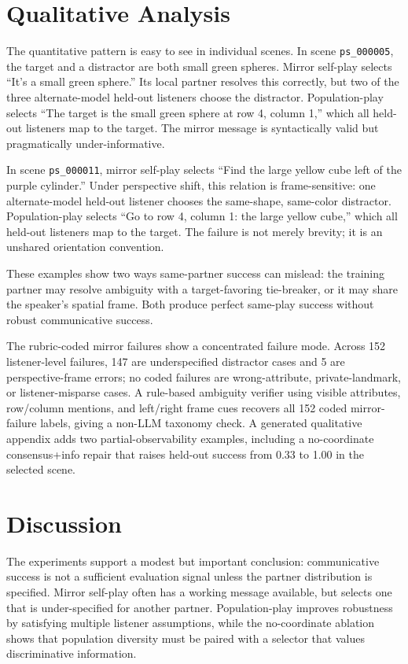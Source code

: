 \documentclass[10pt]{article}
\begin{document}
\section{Qualitative Analysis}

The quantitative pattern is easy to see in individual scenes. In scene \texttt{ps\_000005}, the target and a distractor are both small green spheres. Mirror self-play selects ``It's a small green sphere.'' Its local partner resolves this correctly, but two of the three alternate-model held-out listeners choose the distractor. Population-play selects ``The target is the small green sphere at row 4, column 1,'' which all held-out listeners map to the target. The mirror message is syntactically valid but pragmatically under-informative.

In scene \texttt{ps\_000011}, mirror self-play selects ``Find the large yellow cube left of the purple cylinder.'' Under perspective shift, this relation is frame-sensitive: one alternate-model held-out listener chooses the same-shape, same-color distractor. Population-play selects ``Go to row 4, column 1: the large yellow cube,'' which all held-out listeners map to the target. The failure is not merely brevity; it is an unshared orientation convention.

These examples show two ways same-partner success can mislead: the training partner may resolve ambiguity with a target-favoring tie-breaker, or it may share the speaker's spatial frame. Both produce perfect same-play success without robust communicative success.

The rubric-coded mirror failures show a concentrated failure mode. Across 152 listener-level failures, 147 are underspecified distractor cases and 5 are perspective-frame errors; no coded failures are wrong-attribute, private-landmark, or listener-misparse cases. A rule-based ambiguity verifier using visible attributes, row/column mentions, and left/right frame cues recovers all 152 coded mirror-failure labels, giving a non-LLM taxonomy check. A generated qualitative appendix adds two partial-observability examples, including a no-coordinate consensus+info repair that raises held-out success from 0.33 to 1.00 in the selected scene.

\section{Discussion}

The experiments support a modest but important conclusion: communicative success is not a sufficient evaluation signal unless the partner distribution is specified. Mirror self-play often has a working message available, but selects one that is under-specified for another partner. Population-play improves robustness by satisfying multiple listener assumptions, while the no-coordinate ablation shows that population diversity must be paired with a selector that values discriminative information.
\end{document}
